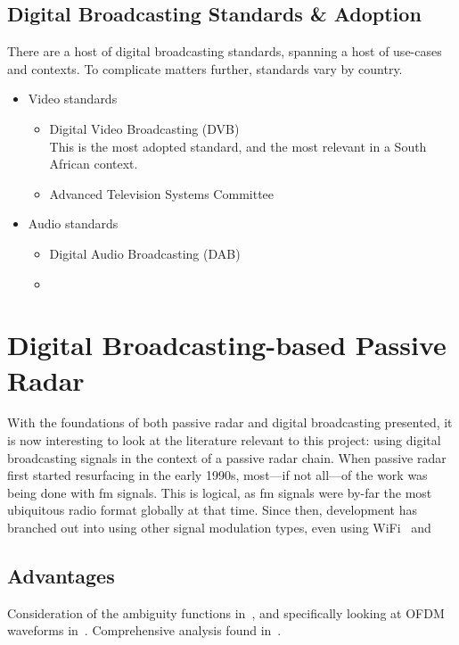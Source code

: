 \documentclass[class=report,11pt,crop=false]{standalone}
\begin{document}
\subsection{Digital Broadcasting Standards \& Adoption}
There are a host of digital broadcasting standards, spanning a host of use-cases and contexts. To complicate matters further, standards vary by country.

\begin{itemize}
    \item Video standards
        \begin{itemize}
            \item Digital Video Broadcasting (DVB) \\
            This is the most adopted standard, and the most relevant in a South African context.
            \item Advanced Television Systems Committee
        \end{itemize}
    \item Audio standards
        \begin{itemize}
            \item Digital Audio Broadcasting (DAB) \\
            \item 
        \end{itemize}
\end{itemize}

\section{Digital Broadcasting-based Passive Radar}
With the foundations of both passive radar and digital broadcasting presented, it is now interesting to look at the literature relevant to this project: using digital broadcasting signals in the context of a passive radar chain. When passive radar first started resurfacing in the early 1990s, most---if not all---of the work was being done with \gls{fm} signals. This is logical, as \gls{fm} signals were by-far the most ubiquitous radio format globally at that time. Since then, development has branched out into using other signal modulation types, even using WiFi~\cite{Guo2008} and 

\subsection{Advantages}

Consideration of the ambiguity functions in~\cite{Griffithsa}, and specifically looking at OFDM waveforms in~\cite{Searle2014}. Comprehensive analysis found in~\cite{Malanowski2019}.
\end{document}
